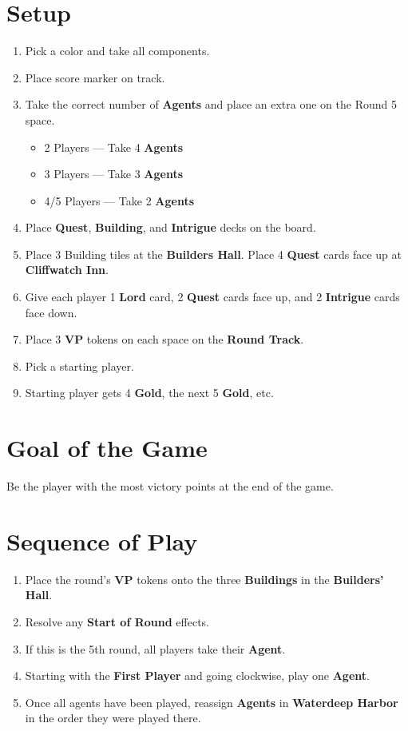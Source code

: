 \documentclass[12pt]{article}
\newenvironment{enumerateCustom}
{\begin{enumerate}
  \setlength{\itemsep}{1pt}
  \setlength{\parskip}{0pt}
  \setlength{\parsep}{0pt}}
{\end{enumerate}}
\newenvironment{itemizeCustom}
{\begin{itemize}
  \setlength{\itemsep}{1pt}
  \setlength{\parskip}{0pt}
  \setlength{\parsep}{0pt}}
{\end{itemize}}
\begin{document}
\begin{mdframed}[style = customFrame]
\begin{multicols*}{2}

\section*{Setup}
\begin{enumerateCustom}
	\item Pick a color and take all components. 
	\item Place score marker on track.
	\item Take the correct number of \textbf{Agents} and place an extra one on the Round 5 space.
		\begin{itemizeCustom}
			\item 2 Players --- Take 4 \textbf{Agents}
			\item 3 Players --- Take 3 \textbf{Agents}
			\item 4/5 Players --- Take 2 \textbf{Agents}
		\end{itemizeCustom}
	\item Place \textbf{Quest}, \textbf{Building}, and \textbf{Intrigue} decks on the board.
	\item Place 3 Building tiles at the \textbf{Builders Hall}. Place 4 \textbf{Quest} cards face up at \textbf{Cliffwatch Inn}.
	\item Give each player 1 \textbf{Lord} card, 2 \textbf{Quest} cards face up, and 2 \textbf{Intrigue} cards face down.
	\item Place 3 \textbf{VP} tokens on each space on the \textbf{Round Track}.
	\item Pick a starting player.
	\item Starting player gets 4 \textbf{Gold}, the next 5 \textbf{Gold}, etc.
\end{enumerateCustom}

\section*{Goal of the Game}
Be the player with the most victory points at the end of the game.

\section*{Sequence of Play}
\begin{enumerateCustom}
	\item Place the round's \textbf{VP} tokens onto the three \textbf{Buildings} in the \textbf{Builders' Hall}.
	\item Resolve any \textbf{Start of Round} effects.
	\item If this is the 5th round, all players take their \textbf{Agent}.
	\item Starting with the \textbf{First Player} and going clockwise, play one \textbf{Agent}.
	\item Once all agents have been played, reassign \textbf{Agents} in \textbf{Waterdeep Harbor} in the order they were played there.
\end{enumerateCustom}


\end{multicols*}
\end{mdframed}
\end{document}
